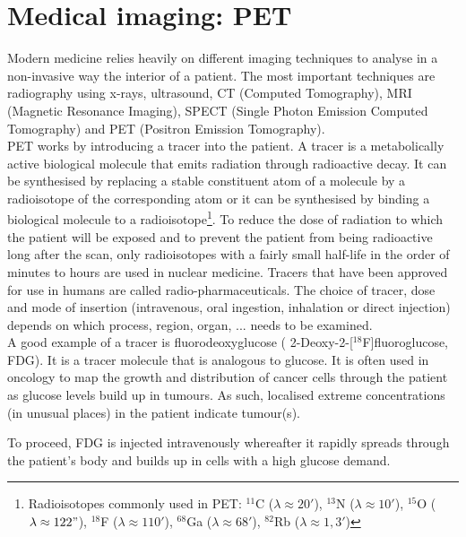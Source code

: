 \documentclass[report,12pt]{report}
\newcommand{\superscript}[1]{\ensuremath{^{\textrm{#1}}}}
\begin{document}
\section{Medical imaging: PET}
Modern medicine relies heavily on different imaging techniques to analyse in a non-invasive way the interior of a patient. The most important techniques are radiography using x-rays, ultrasound, CT (Computed Tomography), MRI (Magnetic Resonance Imaging), SPECT (Single Photon Emission Computed Tomography) and PET (Positron Emission Tomography).\\

PET \cite{petscanners} works by introducing a tracer into the patient. A tracer is a metabolically active biological molecule that emits radiation through radioactive decay. It can be synthesised by replacing a stable constituent atom of a molecule by a radioisotope of the corresponding atom or it can be synthesised by binding a biological molecule to a radioisotope\footnote{Radioisotopes commonly used in PET: \superscript{11}C ($\lambda \approx 20'$), \superscript{13}N ($\lambda \approx 10'$), \superscript{15}O ($\lambda \approx 122"$), \superscript{18}F ($\lambda \approx 110'$), \superscript{68}Ga ($\lambda \approx 68'$), \superscript{82}Rb ($\lambda \approx 1,3'$)}. To reduce the dose of radiation to which the patient will be exposed and to prevent the patient from being radioactive long after the scan, only radioisotopes with a fairly small half-life in the order of minutes to hours are used in nuclear medicine. Tracers that have been approved for use in humans are called radio-pharmaceuticals. The choice of tracer, dose and mode of insertion (intravenous, oral ingestion, inhalation or direct injection) depends on which process, region, organ, ... needs to be examined.\\

A good example of a tracer is fluorodeoxyglucose ( 2-Deoxy-2-[\superscript{18}F]fluoroglucose, FDG). It is a tracer molecule that is analogous to glucose. It is often used in oncology to map the growth and distribution of cancer cells through the patient as glucose levels build up in tumours. As such, localised extreme concentrations (in unusual places) in the patient indicate tumour(s). 

To proceed, FDG is injected intravenously whereafter it rapidly spreads through the patient's body and builds up in cells with a high glucose demand.
\end{document}
